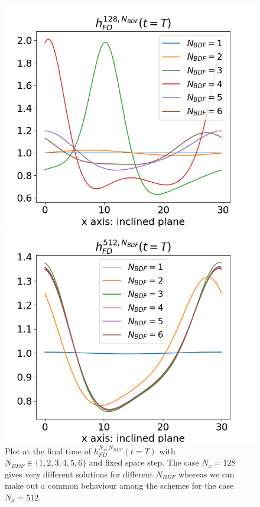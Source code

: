 \documentclass[12pt]{article}
\begin{document}
\begin{figure}[htbp]
    \centering
    \begin{minipage}[b]{0.49\textwidth}
        \centering
        \includegraphics[width=\textwidth]{Verif_scheme/plot_FD_BDF_Nx_128.png}
        \caption{$N_x = 128$}
        \label{fig:image1}
    \end{minipage}
    \hfill
    \begin{minipage}[b]{0.49\textwidth}
        \centering
        \includegraphics[width=\textwidth]{Verif_scheme/plot_FD_BDF_Nx_512.png}
        \caption{$N_x=512$}
        \label{fig:image2}
    \end{minipage}
    \caption{Plot at the final time of $h_{FD}^{N_x, N_{BDF}}(t=T)$ with $N_{BDF} \in \{1, 2, 3, 4, 5, 6\}$ and
    fixed space step. The case $N_x=128$ gives very different solutions for different $N_{BDF}$ whereas we 
    can make out a common behaviour among the schemes for the case $N_x=512.$  }
    \label{fig:BDF_plot_128_512}
\end{figure}
\end{document}
